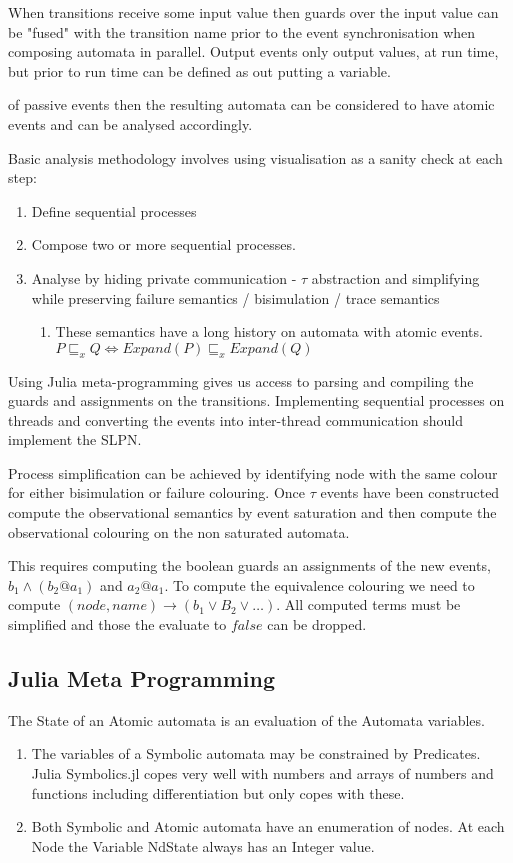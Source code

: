 When transitions receive some input value then  guards over the input value can be "fused" with the transition name prior to the event synchronisation when composing automata in parallel. Output events only output values, at run time, but prior to run time can be defined as out putting a variable.


of passive events then the resulting automata can be considered to have atomic events and can be analysed accordingly.  


Basic analysis methodology involves  using visualisation as a sanity check at each step:

\begin{enumerate}
\item Define sequential processes 
\item Compose two or more sequential processes.
\item Analyse by hiding private communication - $\tau$ abstraction and simplifying while preserving failure semantics / bisimulation / trace semantics 
  \begin{enumerate}
    \item These semantics have a long history on automata with atomic events. $P\sqsubseteq_x Q \iff  Expand(P)\sqsubseteq_x Expand(Q)$
   \end{enumerate}
\end{enumerate}

Using Julia meta-programming  gives us access to parsing and compiling the guards and assignments on the transitions. Implementing sequential processes on  threads and converting the events into inter-thread communication should implement the SLPN.


Process simplification can be achieved by identifying node with the same colour for either bisimulation or failure colouring. Once $\tau$ events have been constructed compute the observational semantics by event saturation and then compute the observational colouring on the non saturated automata.

This requires computing the boolean guards an assignments  of the new events, $b_1\wedge (b_2@a_1)$ and $a_2@a_1$. To compute the equivalence colouring  we need to compute $(node,name)\rightarrow (b_1\vee B_2\vee\ldots)$. All computed terms must be simplified and those the evaluate to $false$ can be dropped.




\subsection{Julia Meta Programming}
The State of an Atomic automata is an evaluation of the Automata variables.
\begin{enumerate}
\item The variables of a Symbolic automata may be constrained by Predicates. Julia Symbolics.jl copes very well with numbers and arrays of numbers and functions including differentiation but only copes with these.

\item Both Symbolic and Atomic automata have an enumeration of nodes. At each Node the Variable NdState always has an Integer value.
\end{enumerate}

